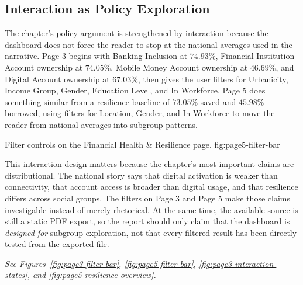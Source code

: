 \documentclass[../main.tex]{subfiles}
\begin{document}
\subsection{Interaction as Policy Exploration}
\label{subsec:interaction-exploration-story}

The chapter's policy argument is strengthened by interaction because the
dashboard does not force the reader to stop at the national averages used in
the narrative. Page 3 begins with Banking Inclusion at \(74.93\%\), Financial
Institution Account ownership at \(74.05\%\), Mobile Money Account ownership at
\(46.69\%\), and Digital Account ownership at \(67.03\%\), then gives the user
filters for Urbanicity, Income Group, Gender, Education Level, and In
Workforce. Page 5 does something similar from a resilience baseline of
\(73.05\%\) saved and \(45.98\%\) borrowed, using filters for Location, Gender,
and In Workforce to move the reader from national averages into subgroup
patterns.

{Filter controls on the Financial Health \& Resilience page.}
{fig:page5-filter-bar}

This interaction design matters because the chapter's most important claims are
distributional. The national story says that digital activation is weaker than
connectivity, that account access is broader than digital usage, and that
resilience differs across social groups. The filters on Page 3 and Page 5 make
those claims investigable instead of merely rhetorical. At the same time, the
available source is still a static PDF export, so the report should only claim
that the dashboard is \emph{designed for} subgroup exploration, not that every
filtered result has been directly tested from the exported file.

\noindent\textit{See Figures~\ref{fig:page3-filter-bar},
\ref{fig:page5-filter-bar}, \ref{fig:page3-interaction-states}, and
\ref{fig:page5-resilience-overview}.}
\end{document}
